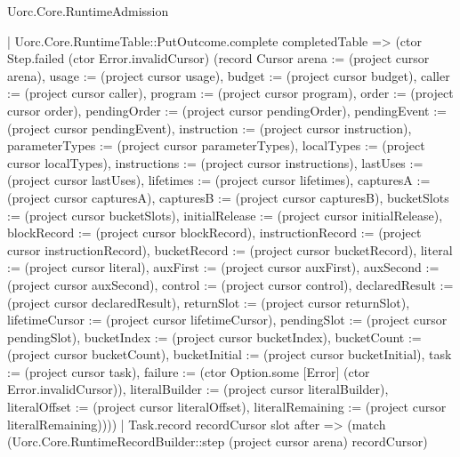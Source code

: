 \begin{lexlean}{Uorc.Core.RuntimeAdmission}
\begin{semanticmodule}
{      | Uorc.Core.RuntimeTable::PutOutcome.complete completedTable => (ctor Step.failed (ctor Error.invalidCursor) (record Cursor {arena := (project cursor arena), usage := (project cursor usage), budget := (project cursor budget), caller := (project cursor caller), program := (project cursor program), order := (project cursor order), pendingOrder := (project cursor pendingOrder), pendingEvent := (project cursor pendingEvent), instruction := (project cursor instruction), parameterTypes := (project cursor parameterTypes), localTypes := (project cursor localTypes), instructions := (project cursor instructions), lastUses := (project cursor lastUses), lifetimes := (project cursor lifetimes), capturesA := (project cursor capturesA), capturesB := (project cursor capturesB), bucketSlots := (project cursor bucketSlots), initialRelease := (project cursor initialRelease), blockRecord := (project cursor blockRecord), instructionRecord := (project cursor instructionRecord), bucketRecord := (project cursor bucketRecord), literal := (project cursor literal), auxFirst := (project cursor auxFirst), auxSecond := (project cursor auxSecond), control := (project cursor control), declaredResult := (project cursor declaredResult), returnSlot := (project cursor returnSlot), lifetimeCursor := (project cursor lifetimeCursor), pendingSlot := (project cursor pendingSlot), bucketIndex := (project cursor bucketIndex), bucketCount := (project cursor bucketCount), bucketInitial := (project cursor bucketInitial), task := (project cursor task), failure := (ctor Option.some [Error] (ctor Error.invalidCursor)), literalBuilder := (project cursor literalBuilder), literalOffset := (project cursor literalOffset), literalRemaining := (project cursor literalRemaining)})))
    | Task.record recordCursor slot after => (match (Uorc.Core.RuntimeRecordBuilder::step (project cursor arena) recordCursor)
}
\end{semanticmodule}
\end{lexlean}
